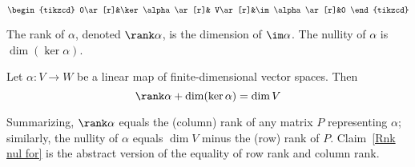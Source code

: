 \[\begin{tikzcd}
0\ar[r]&\ker\alpha\ar[r]& V\ar[r]&\im\alpha\ar[r]&0
\end{tikzcd}\]
\begin{definition}
The rank of $\alpha$, denoted $\rank\alpha$, is the dimension of $\im\alpha$. The nullity of $\alpha$ is $\dim(\ker\alpha)$.
\end{definition}
\begin{claim}\label{Rnk nul for}
Let $\alpha:V\to W$ be a linear map of finite-dimensional vector spaces. Then
\[\rank\alpha+\dim(\ker\alpha)=\dim V\]
\end{claim}
\vspace{5mm}
Summarizing, $\rank\alpha$ equals the (column) rank of any matrix $P$ representing $\alpha$; similarly, the nullity of $\alpha$ equals $\dim V$ minus the (row) rank of $P$. Claim~\ref{Rnk nul for} is the abstract version of the equality of row rank and column rank.
